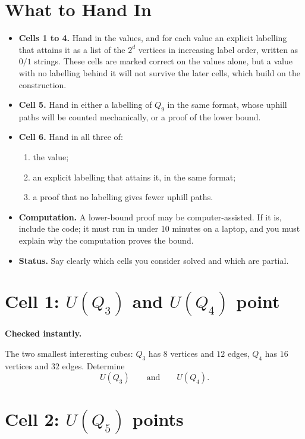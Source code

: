 \documentclass[11pt]{article}
\theoremstyle{definition}
\newcommand{\cell}[3]{%
  \section*{Cell #1: #2\hfill{\normalsize\mdseries #3}}}
\begin{document}
\section*{What to Hand In}

\begin{itemize}[leftmargin=*]
  \item \textbf{Cells 1 to 4.}
    Hand in the values, and for each value an explicit labelling that
    attains it as a list of the $2^d$ vertices in increasing label
    order, written as $0/1$ strings. These cells are marked correct
    on the values alone, but a value with no labelling behind it will
    not survive the later cells, which build on the construction.
  \item \textbf{Cell 5.}
    Hand in either a labelling of $Q_9$ in the same format, whose
    uphill paths will be counted mechanically, or a proof of the
    lower bound.
  \item \textbf{Cell 6.}
    Hand in all three of:
    \begin{enumerate}[leftmargin=*]
      \item the value;
      \item an explicit labelling that attains it, in the same format;
      \item a proof that no labelling gives fewer uphill paths.
    \end{enumerate}
  \item \textbf{Computation.}
    A lower-bound proof may be computer-assisted. If it is, include
    the code; it must run in under 10 minutes on a laptop, and you
    must explain why the computation proves the bound.
  \item \textbf{Status.}
    Say clearly which cells you consider solved and which are
    partial.
\end{itemize}

\cell{1}{$U(Q_3)$ and $U(Q_4)$}{1 point}

\textbf{Checked instantly.}

The two smallest interesting cubes: $Q_3$ has $8$ vertices and $12$
edges, $Q_4$ has $16$ vertices and $32$ edges. Determine
\[
  U(Q_3) \qquad \text{and} \qquad U(Q_4).
\]

\cell{2}{$U(Q_5)$}{2 points}
\end{document}
